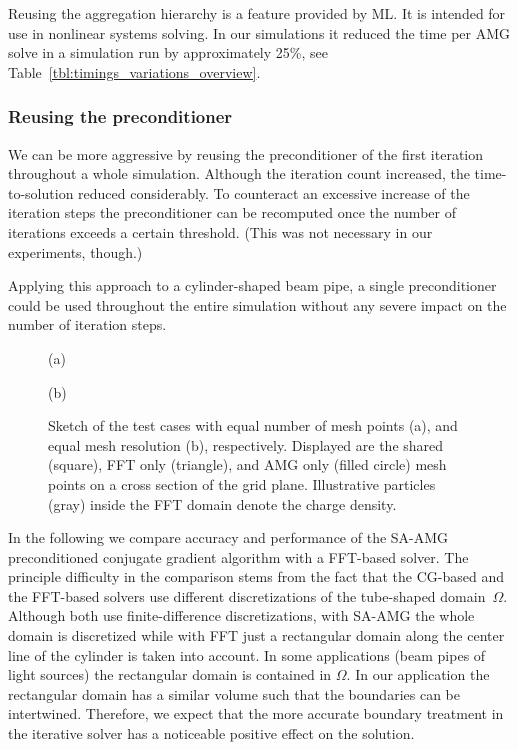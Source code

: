 Reusing the aggregation hierarchy is a feature provided by ML.  It is
intended for use in nonlinear systems solving.  In our simulations it
reduced the time per AMG solve in a simulation run by approximately
25\%, see Table~\ref{tbl:timings_variations_overview}.

\subsubsection*{Reusing the preconditioner}

We can be more aggressive by reusing the preconditioner of the first
iteration throughout a whole simulation.  Although the iteration count
increased, the time-to-solution reduced considerably.  To counteract an
excessive increase of the iteration steps the preconditioner can be
recomputed once the number of iterations exceeds a certain threshold.
(This was not necessary in our experiments, though.)

Applying this approach to a cylinder-shaped beam pipe, a single
preconditioner could be used throughout the entire simulation without
any severe impact on the number of iteration steps.

\begin{figure}[ht]
  \begin{minipage}[b]{0.5\textwidth}
    \centering
    

    (a)
  \end{minipage}
  \begin{minipage}[b]{0.5\textwidth}
    \centering
    

    (b)
  \end{minipage} 
  \caption{Sketch of the test cases with equal number of mesh points
    (a), and equal mesh resolution (b), respectively.  Displayed are the
    shared (square), FFT only (triangle), and AMG only (filled circle) mesh
    points on a cross section of the grid plane.  Illustrative particles
    (gray) inside the FFT domain denote the charge density.}

  \label{fig:meshcmp}
\end{figure}

In the following we compare accuracy and performance of the
SA-AMG preconditioned conjugate gradient algorithm with a FFT-based
solver.  The principle difficulty in the comparison stems from the fact
that the CG-based and the FFT-based solvers use different
discretizations of the tube-shaped domain~$\Omega$.  Although both use
finite-difference discretizations, with SA-AMG the whole domain is
discretized while with FFT just a rectangular domain along the center
line of the cylinder is taken into account.  In some applications
(beam pipes of light sources) the rectangular domain is contained in $\Omega$.  In
our application the rectangular domain has a similar volume such that
the boundaries can be intertwined.  Therefore, we expect that the more
accurate boundary treatment in the iterative solver has a noticeable
positive effect on the solution.

